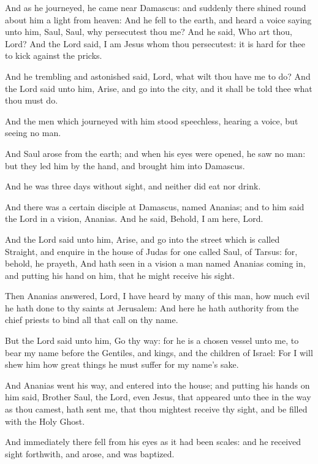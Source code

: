 \verse And as he journeyed, he came near Damascus: and suddenly there shined round about him a light from heaven: \verse And he fell to the earth, and heard a voice saying unto him, Saul, Saul, why persecutest thou me?  \verse And he said, Who art thou, Lord? And the Lord said, I am Jesus whom thou persecutest: it is hard for thee to kick against the pricks.

\verse And he trembling and astonished said, Lord, what wilt thou have me to do? And the Lord said unto him, Arise, and go into the city, and it shall be told thee what thou must do.

\verse And the men which journeyed with him stood speechless, hearing a voice, but seeing no man.

\verse And Saul arose from the earth; and when his eyes were opened, he saw no man: but they led him by the hand, and brought him into Damascus.

\verse And he was three days without sight, and neither did eat nor drink.

\verse And there was a certain disciple at Damascus, named Ananias; and to him said the Lord in a vision, Ananias. And he said, Behold, I am here, Lord.

\verse And the Lord said unto him, Arise, and go into the street which is called Straight, and enquire in the house of Judas for one called Saul, of Tarsus: for, behold, he prayeth, \verse And hath seen in a vision a man named Ananias coming in, and putting his hand on him, that he might receive his sight.

\verse Then Ananias answered, Lord, I have heard by many of this man, how much evil he hath done to thy saints at Jerusalem: \verse And here he hath authority from the chief priests to bind all that call on thy name.

\verse But the Lord said unto him, Go thy way: for he is a chosen vessel unto me, to bear my name before the Gentiles, and kings, and the children of Israel: \verse For I will shew him how great things he must suffer for my name's sake.

\verse And Ananias went his way, and entered into the house; and putting his hands on him said, Brother Saul, the Lord, even Jesus, that appeared unto thee in the way as thou camest, hath sent me, that thou mightest receive thy sight, and be filled with the Holy Ghost.

\verse And immediately there fell from his eyes as it had been scales: and he received sight forthwith, and arose, and was baptized.

